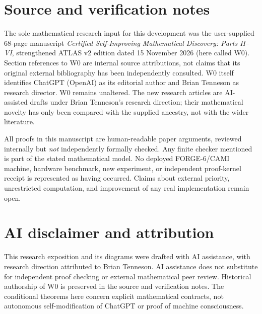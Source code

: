 \documentclass[11pt,letterpaper]{article}
\theoremstyle{definition}
\theoremstyle{remark}
\begin{document}
\section*{Source and verification notes}
The sole mathematical research input for this development was the user-supplied 68-page manuscript \emph{Certified Self-Improving Mathematical Discovery: Parts II--VI}, strengthened ATLAS v2 edition dated 15 November 2026 (here called W0). Section references to W0 are internal source attributions, not claims that its original external bibliography has been independently consulted. W0 itself identifies ChatGPT (OpenAI) as its editorial author and Brian Tenneson as research director. W0 remains unaltered. The new research articles are AI-assisted drafts under Brian Tenneson's research direction; their mathematical novelty has only been compared with the supplied ancestry, not with the wider literature.

All proofs in this manuscript are human-readable paper arguments, reviewed internally but \emph{not} independently formally checked. Any finite checker mentioned is part of the stated mathematical model. No deployed FORGE-6/CAMI machine, hardware benchmark, new experiment, or independent proof-kernel receipt is represented as having occurred. Claims about external priority, unrestricted computation, and improvement of any real implementation remain open.

\section*{AI disclaimer and attribution}
This research exposition and its diagrams were drafted with AI assistance, with research direction attributed to Brian Tenneson. AI assistance does not substitute for independent proof checking or external mathematical peer review. Historical authorship of W0 is preserved in the source and verification notes. The conditional theorems here concern explicit mathematical contracts, not autonomous self-modification of ChatGPT or proof of machine consciousness.
\end{document}

